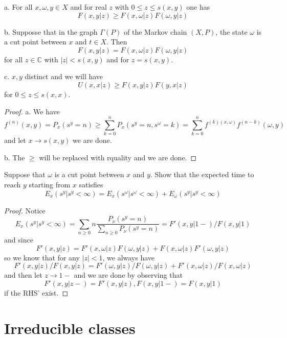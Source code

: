 \documentclass[lang=en, color=blue, ]{elegantbook}
\newcommand{\C}{\mathbb{C}}
\begin{document}
\begin{proposition}
    a. For all $x,\omega,y\in X$ and for real $z$ with $0\leq z \leq s(x,y)$ one has
    \[
    F(x,y|z) \geq F(x,\omega|z)F(\omega, y|z)
    \]\par
    b. Supposse that in the graph $\Gamma(P)$ of the Markov chain $(X,P)$, the state $\omega$ is a cut point between $x$ and $t\in X$. Then
    \[F(x,y|z) = F(x,\omega|z)F(\omega,y|z)\]
    for all $z\in \C$ with $|z| < s(x,y)$ and for $z = s(x,y)$.\par
    c. $x,y$ distinct and we will have
    \[
    U(x,x|z) \geq F(x,y|z)F(y,x|z)
    \]
    for $0\leq z\leq s(x,x)$.\par
\end{proposition}
\begin{proof}
    a. We have
    \[
    f^{(n)}(x,y) = P_x(s^y = n) \geq \sum\limits_{k=0}^n P_{x}(s^y = n, s^{\omega} = k) = \sum\limits_{k=0}^n f^{(k)(x,\omega)}f^{(n-k)}(\omega,y)
    \]
    and let $x\to s(x,y)$ we are done.\par
    b. The $\geq$ will be replaced with rquality and we are done.
\end{proof}

\begin{corollary}
    Suppose that $\omega$ is a cut point between $x$ and $y$. Show that the expected time to reach $y$ starting from $x$ satisfies
    \[
    E_x(s^y|s^y<\infty) = E_x(s^{\omega}|s^{\omega}<\infty) + E_{\omega}(s^y|s^y<\infty)
    \]
\end{corollary}
\begin{proof}
    Notice
    \[
    E_x(s^y|s^y<\infty) = \sum\limits_{n\geq 0} n\dfrac{P_{\nu}(s^y = n)}{\sum\limits_{n\geq 0} P_{\nu}(s^y = n)} = F'(x,y|1-)/F(x,y|1)
    \]
    and since
    \[
    F'(x,y|z) = F'(x,\omega|z)F(\omega,y|z) + F(x,\omega|z)F'(\omega,y|z)
    \]
    so we know that for any $|z|<1$, we always have
    \[
    F'(x,y|z)/F(x,y|z) = F'(\omega,y|z)/F(\omega,y|z)+F'(x,\omega|z)/F(x,\omega|z)
    \]
    and then let $z\to 1-$ and we are done by observing that
    \[
    F'(x,y|z-) = F'(x,y|z), F(x,y|1-) = F(x,y|1)
    \]
    if the RHS' exist.
\end{proof}

\section{Irreducible classes}
\end{document}
